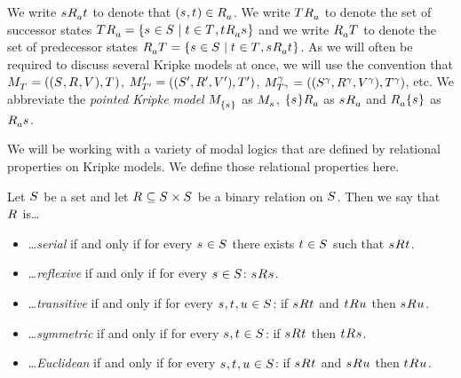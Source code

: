 We write $\stateS \accessibility{\agentA} \stateT$ to denote that $(\stateS, \stateT) \in \accessibility{\agentA}$.
We write $\successors{\agentA}{\statesT}$ to denote the set of successor states $\successors{\agentA}{\statesT} = \{\stateS \in \states \mid \stateT \in \statesT, \stateT \accessibility{\agentA} \stateS\}$ and
we write $\predecessors{\agentA}{\statesT}$ to denote the set of predecessor states $\predecessors{\agentA}{\statesT} = \{\stateS \in \states \mid \stateT \in \statesT, \stateS \accessibility{\agentA} \stateT\}$.
As we will often be required to discuss several Kripke models at once, we will use the convention that $\pointedModelAndTuple{\statesT}$, $\pointedModelAndTuple[\prime]{\statesT[\prime]}$, $\pointedModelAndTuple[\gamma]{\statesT[\gamma]}$, etc.
We abbreviate the {\em pointed Kripke model}
$\pointedModel{\{\stateS\}}$ as $\pointedModel{\stateS}$,
$\successors{\agentA}{\{\stateS\}}$ as $\successors{\agentA}{\stateS}$ and
$\predecessors{\agentA}{\{\stateS\}}$ as $\predecessors{\agentA}{\stateS}$.

We will be working with a variety of modal logics that are defined by relational properties on Kripke models.
We define those relational properties here.

\begin{definition}
Let $\states$ be a set and let $\accessibilityRel \subseteq \states \times \states$ be a binary relation on $\states$. 
Then we say that $\accessibilityRel$ is\ldots
\begin{itemize}
    \item \ldots {\em serial} if and only if for every $\stateS \in \states$ there exists $\stateT \in \states$ such that $\stateS \accessibility{} \stateT$.
    \item \ldots {\em reflexive} if and only if for every $\stateS \in \states$: $\stateS \accessibility{} \stateS$.
    \item \ldots {\em transitive} if and only if for every $\stateS, \stateT, \stateU \in \states$: if $\stateS \accessibility{} \stateT$ and $\stateT \accessibility{} \stateU$ then $\stateS \accessibility{} \stateU$.
    \item \ldots {\em symmetric} if and only if for every $\stateS, \stateT \in \states$: if $\stateS \accessibility{} \stateT$ then $\stateT \accessibility{} \stateS$.
    \item \ldots {\em Euclidean} if and only if for every $\stateS, \stateT, \stateU \in \states$: if $\stateS \accessibility{} \stateT$ and $\stateS \accessibility{} \stateU$ then $\stateT \accessibility{} \stateU$.
\end{itemize}
\end{definition}

